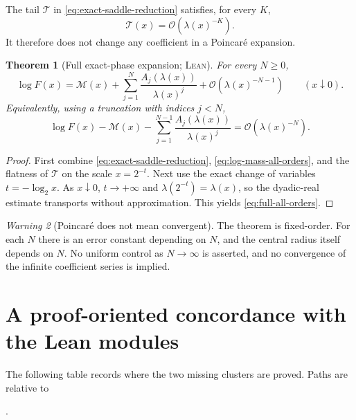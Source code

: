 \documentclass[11pt,oneside]{article}
\newtheorem{theorem}{Theorem}[section]
\theoremstyle{definition}
\theoremstyle{remark}
\newtheorem{warning}[theorem]{Warning}
\newcommand{\bigO}{\mathcal O}
\newcommand{\Formalized}{\textsc{Lean}}
\newcommand{\Main}{\mathcal M}
\begin{document}
The tail $\mathcal T$ in \eqref{eq:exact-saddle-reduction} satisfies, for
every $K$,
\[
 \mathcal T(x)=\bigO(\lambda(x)^{-K}).
\]
It therefore does not change any coefficient in a Poincar\'e expansion.

\begin{theorem}[Full exact-phase expansion; \Formalized]
\label{thm:full-all-orders}
For every $N\geq0$,
\begin{equation}
 \log F(x)
 =\Main(x)+
   \sum_{j=1}^{N}\frac{A_j(\lambda(x))}{\lambda(x)^j}
   +\bigO(\lambda(x)^{-N-1})
 \qquad(x\downarrow0). \label{eq:full-all-orders}
\end{equation}
Equivalently, using a truncation with indices $j<N$,
\[
 \log F(x)-\Main(x)-
 \sum_{j=1}^{N-1}\frac{A_j(\lambda(x))}{\lambda(x)^j}
 =\bigO(\lambda(x)^{-N}).
\]
\end{theorem}

\begin{proof}
First combine \eqref{eq:exact-saddle-reduction},
\eqref{eq:log-mass-all-orders}, and the flatness of $\mathcal T$ on the
scale $x=2^{-t}$.  Next use the exact change of variables
$t=-\log_2x$.  As $x\downarrow0$, $t\to+\infty$ and
$\lambda(2^{-t})=\lambda(x)$, so the dyadic-real estimate transports
without approximation.  This yields \eqref{eq:full-all-orders}.
\end{proof}

\begin{warning}[Poincar\'e does not mean convergent]
The theorem is fixed-order.  For each $N$ there is an error constant
depending on $N$, and the central radius itself depends on $N$.  No
uniform control as $N\to\infty$ is asserted, and no convergence of the
infinite coefficient series is implied.
\end{warning}

\section{A proof-oriented concordance with the Lean modules}
\label{sec:module-concordance}

The following table records where the two missing clusters are proved.
Paths are relative to
\begin{center}
.
\end{center}
\end{document}
